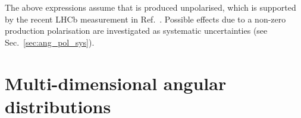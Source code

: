 %
%


The above expressions assume that \Lb is produced unpolarised, which is supported by the recent LHCb
measurement in Ref.~\cite{LHCb-PAPER-2012-057}. Possible effects due to a non-zero production polarisation
are investigated as systematic uncertainties (see Sec.~\ref{sec:ang_pol_sys}).


\section{Multi-dimensional angular distributions}
\label{sec:multidim_ang_distrib}

